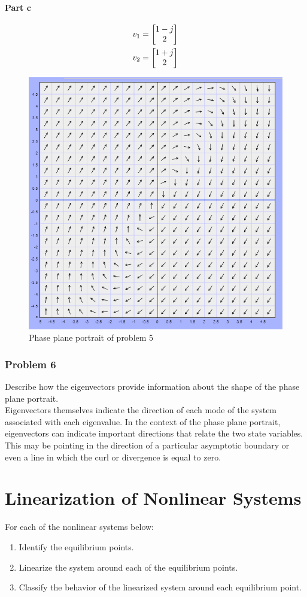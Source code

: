 \documentclass[]{article}
\begin{document}
\subsection{Part c}


\begin{align*}
	v_1
	&= \mqty[1-j\\2]\\
	v_2
	&= \mqty[1+j\\2]
\end{align*}



\begin{figure}[p]
	\centering
	\includegraphics[width=0.7\linewidth]{fig/pblm5}
	\caption{Phase plane portrait of problem 5}
	\label{fig:pblm5}
\end{figure}




\section{Problem 6}
Describe how the eigenvectors provide information about the shape of the phase plane portrait.\\

Eigenvectors themselves indicate the direction of each mode of the system associated with each eigenvalue. In the context of the phase plane portrait, eigenvectors can indicate important directions that relate the two state variables. This may be pointing in the direction of a particular asymptotic boundary or even a line in which the curl or divergence is equal to zero.




\newpage
\part{Linearization of Nonlinear Systems}
For each of the nonlinear systems below:
\begin{enumerate}
	\item Identify the equilibrium points.
	\item Linearize the system around each of the equilibrium points.
	\item Classify the behavior of the linearized system around each equilibrium point.
\end{enumerate}
\end{document}
